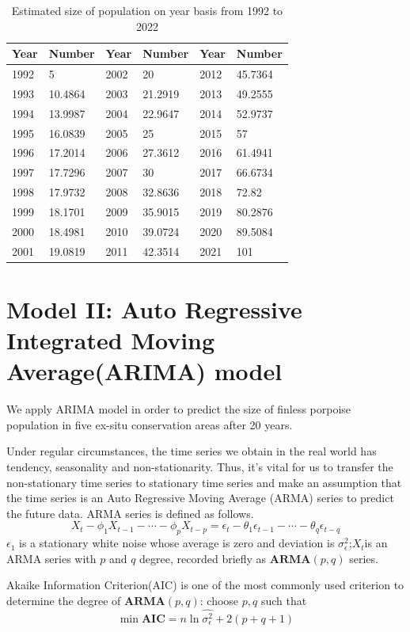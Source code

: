 \documentclass{mcmthesis}
\numberwithin{figure}{section}
\numberwithin{table}{section}
\numberwithin{equation}{section}
\begin{document}
\begin{table}[htpb!]
  \centering
  \caption{Estimated size of population on year basis from 1992 to 2022} \label{Lagrange table}
  \begin{tabular}{m{2cm}<{\centering}|m{2cm}<{\centering}|m{2cm}<{\centering}|m{2cm}<{\centering}|m{2cm}<{\centering}|m{2cm}<{\centering}}
  \rowcolor{darkOrange}  \textbf{Year}&\textbf{Number}&\textbf{Year}&\textbf{Number}&\textbf{Year}&\textbf{Number}\\ \hline
  \rowcolor{Orange}  1992 & 5       & 2002 & 20      & 2012 & 45.7364 \\
  \rowcolor{lightOrange}  1993 & 10.4864 & 2003 & 21.2919 & 2013 & 49.2555 \\
  \rowcolor{Orange}  1994 & 13.9987 & 2004 & 22.9647 & 2014 & 52.9737 \\
  \rowcolor{lightOrange}  1995 & 16.0839 & 2005 & 25      & 2015 & 57      \\
  \rowcolor{Orange}  1996 & 17.2014 & 2006 & 27.3612 & 2016 & 61.4941 \\
  \rowcolor{lightOrange}  1997 & 17.7296 & 2007 & 30      & 2017 & 66.6734 \\
  \rowcolor{Orange}  1998 & 17.9732 & 2008 & 32.8636 & 2018 & 72.82   \\
  \rowcolor{lightOrange}  1999 & 18.1701 & 2009 & 35.9015 & 2019 & 80.2876 \\
  \rowcolor{Orange}  2000 & 18.4981 & 2010 & 39.0724 & 2020 & 89.5084 \\
  \rowcolor{lightOrange}  2001 & 19.0819 & 2011 & 42.3514 & 2021 & 101     \\
  \end{tabular}
\end{table}

\section{Model II: Auto Regressive Integrated Moving Average(ARIMA) model}
We apply ARIMA model in order to predict the size of finless porpoise population in five ex-situ 
conservation areas after 20 years.
\par
Under regular circumstances, the time series we obtain in the real world
has tendency, seasonality and non-stationarity. Thus, it's vital for 
us to transfer the non-stationary time series to stationary time series and 
make an assumption that the time series is an Auto Regressive Moving Average
(ARMA) series to predict the future data.  ARMA series is defined as follows.
$$
  X_t-\phi_1X_{t-1}-\cdots -\phi_pX_{t-p} = \epsilon_t - 
  \theta_1\epsilon_{t-1}-\cdots-\theta_q\epsilon_{t-q}
$$ 
$ \epsilon_1 $ is a stationary white noise whose average is zero and
deviation is $ \sigma_\epsilon^2 $;$ X_t $is an ARMA series with $ p $ and $ q $
degree, recorded briefly as $ \mathbf{ARMA}(p,q) $ series.
\par
Akaike Information Criterion(AIC) is one of the most commonly used
criterion to determine the degree of $ \mathbf{ARMA}(p,q) $: choose 
$ p,q $ such that 
\begin{equation}\label{AIC}
    \min \mathbf{AIC} = n\ln \hat{\sigma_\epsilon^2} + 2(p+q+1)
\end{equation}
\end{document}

